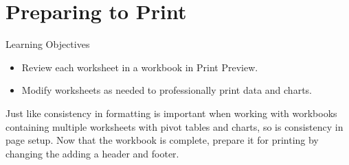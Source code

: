 %
%			
%			

\section{Preparing to Print}

\begin{center}
	\begin{objbox}{Learning Objectives}
		\begin{itemize}
			\setlength{\itemsep}{0pt}
			\setlength{\parskip}{0pt}
			\setlength{\parsep}{0pt}
			
			\item Review each worksheet in a workbook in Print Preview.
			\item Modify worksheets as needed to professionally print data and charts.
			
		\end{itemize}
	\end{objbox}
\end{center}

Just like consistency in formatting is important when working with workbooks containing multiple worksheets with pivot tables and charts,  so is consistency in page setup. Now that the  workbook is complete, prepare it for printing by changing the adding a header and footer. 

